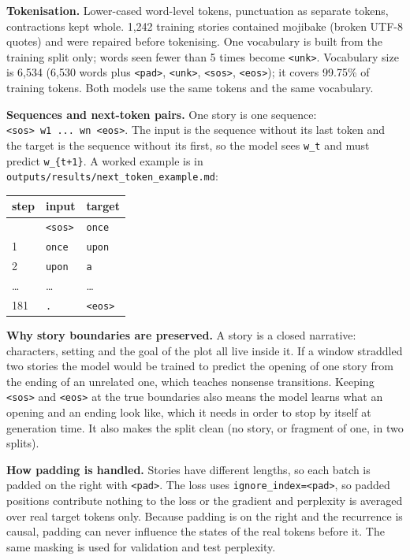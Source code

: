 \documentclass[10pt,a4paper]{article}
\begin{document}
\textbf{Tokenisation.} Lower-cased word-level tokens, punctuation as separate tokens, contractions kept whole.
1,242 training stories contained mojibake (broken UTF-8 quotes) and were repaired before tokenising. One vocabulary
is built from the training split only; words seen fewer than 5 times become \texttt{\textless{}unk\textgreater{}}. Vocabulary size is 6,534
(6,530 words plus \texttt{\textless{}pad\textgreater{}}, \texttt{\textless{}unk\textgreater{}}, \texttt{\textless{}sos\textgreater{}}, \texttt{\textless{}eos\textgreater{}}); it covers 99.75\% of training tokens. Both models use the same
tokens and the same vocabulary.

\textbf{Sequences and next-token pairs.} One story is one sequence: \texttt{\textless{}sos\textgreater{}\ w1\ ...\ wn\ \textless{}eos\textgreater{}}. The input is the sequence
without its last token and the target is the sequence without its first, so the model sees \texttt{w\_t} and must predict
\texttt{w\_\{t+1\}}. A worked example is in \texttt{outputs/results/next\_token\_example.md}:

\begin{longtable}[]{@{}lll@{}}
\toprule\noalign{}
step & input & target \\
\midrule\noalign{}
\endhead
\bottomrule\noalign{}
\endlastfoot
0 & \texttt{\textless{}sos\textgreater{}} & \texttt{once} \\
1 & \texttt{once} & \texttt{upon} \\
2 & \texttt{upon} & \texttt{a} \\
\ldots{} & \ldots{} & \ldots{} \\
181 & \texttt{.} & \texttt{\textless{}eos\textgreater{}} \\
\end{longtable}

\textbf{Why story boundaries are preserved.} A story is a closed narrative: characters, setting and the goal of the
plot all live inside it. If a window straddled two stories the model would be trained to predict the opening of
one story from the ending of an unrelated one, which teaches nonsense transitions. Keeping \texttt{\textless{}sos\textgreater{}} and \texttt{\textless{}eos\textgreater{}} at the
true boundaries also means the model learns what an opening and an ending look like, which it needs in order to stop
by itself at generation time. It also makes the split clean (no story, or fragment of one, in two splits).

\textbf{How padding is handled.} Stories have different lengths, so each batch is padded on the right with \texttt{\textless{}pad\textgreater{}}.
The loss uses \texttt{ignore\_index=\textless{}pad\textgreater{}}, so padded positions contribute nothing to the loss or the gradient and perplexity
is averaged over real target tokens only. Because padding is on the right and the recurrence is causal, padding can
never influence the states of the real tokens before it. The same masking is used for validation and test perplexity.
\end{document}
